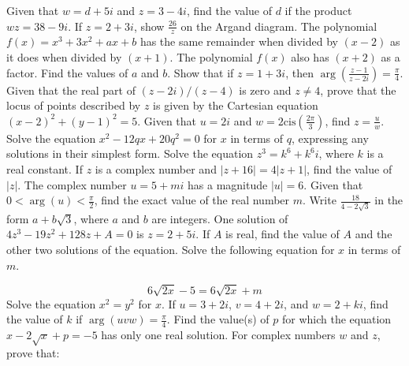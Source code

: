 \documentclass[12pt,addpoints]{exam}
\begin{document}
\begin{questions}
\fillwithlines{5cm}
\question[5] Given that \( w = d + 5i \) and \( z = 3 - 4i \), find the value of \( d \) if the product \( wz = 38 - 9i \).
\fillwithlines{5cm}
\question[5] If \( z = 2 + 3i \), show \(\frac{26}{z}\) on the Argand diagram.
\fillwithlines{5cm}
\question[5] The polynomial \( f(x) = x^3 + 3x^2 + ax + b \) has the same remainder when divided by \( (x - 2) \) as it does when divided by \( (x + 1) \). The polynomial \( f(x) \) also has \( (x + 2) \) as a factor. Find the values of \( a \) and \( b \).
\fillwithlines{5cm}
\question[5] Show that if \( z = 1 + 3i \), then \(\arg \left( \frac{z - 1}{z - 2i} \right) = \frac{\pi}{4}\).
\fillwithlines{5cm}
\question[5] Given that the real part of \((z - 2i) / (z - 4)\) is zero and \(z \neq 4\), prove that the locus of points described by \(z\) is given by the Cartesian equation \((x - 2)^2 + (y - 1)^2 = 5\).
\fillwithlines{5cm}
\question[5] Given that \( u = 2i \) and \( w = 2 \text{cis} \left( \frac{2\pi}{3} \right) \), find \( z = \frac{u}{w} \).
\fillwithlines{5cm}
\question[5] Solve the equation \( x^2 - 12qx + 20q^2 = 0 \) for \( x \) in terms of \( q \), expressing any solutions in their simplest form.
\fillwithlines{5cm}
\question[5] Solve the equation \( z^3 = k^6 + k^6 i \), where \( k \) is a real constant.
\fillwithlines{5cm}
\question[5] If \( z \) is a complex number and \( |z + 16| = 4|z + 1| \), find the value of \( |z| \).
\fillwithlines{5cm}
\question[5] The complex number \( u = 5 + mi \) has a magnitude \( |u| = 6 \). Given that \( 0 < \arg(u) < \frac{\pi}{2} \), find the exact value of the real number \( m \).
\fillwithlines{5cm}
\question[5] Write \( \frac{18}{4 - 2\sqrt{3}} \) in the form \( a + b\sqrt{3} \), where \( a \) and \( b\) are integers.
\fillwithlines{5cm}
\question[5] One solution of \(4z^3 - 19z^2 + 128z + A = 0\) is \(z = 2 + 5i\). If \(A\) is real, find the value of \(A\) and the other two solutions of the equation.
\fillwithlines{5cm}
\question[5] Solve the following equation for \(x\) in terms of \(m\).

\[6\sqrt{2x} - 5 = 6\sqrt{2x} + m\]
\fillwithlines{5cm}
\question[5] Solve the equation \( x^2 = y^2 \) for \( x \).
\fillwithlines{5cm}
\question[5] If \( u = 3 + 2i \), \( v = 4 + 2i \), and \( w = 2 + ki \), find the value of \( k \) if \(\arg(uvw) = \frac{\pi}{4}\).
\fillwithlines{5cm}
\question[5] Find the value(s) of \( p \) for which the equation \( x - 2\sqrt{x} + p = -5 \) has only one real solution.
\fillwithlines{5cm}
\question[5] For complex numbers \( w \) and \( z \), prove that:


\end{questions}
\end{document}

